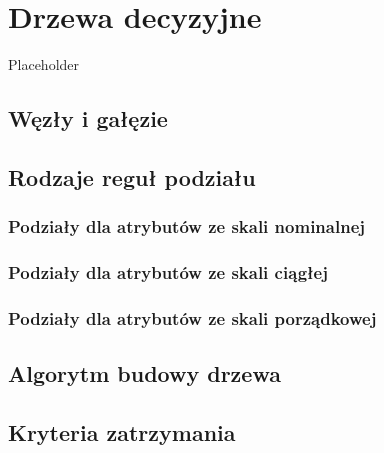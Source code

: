 \documentclass[]{book}
\theoremstyle{plain}
\theoremstyle{definition}
\begin{document}
\hypertarget{drzewa-decyzyjne}{%
\chapter{Drzewa decyzyjne}\label{drzewa-decyzyjne}}

Placeholder

\hypertarget{wezy-i-gaezie}{%
\section{Węzły i gałęzie}\label{wezy-i-gaezie}}

\hypertarget{rodzaje-regu-podziau}{%
\section{Rodzaje reguł podziału}\label{rodzaje-regu-podziau}}

\hypertarget{podziay-dla-atrybutow-ze-skali-nominalnej}{%
\subsection{Podziały dla atrybutów ze skali nominalnej}\label{podziay-dla-atrybutow-ze-skali-nominalnej}}

\hypertarget{podziay-dla-atrybutow-ze-skali-ciagej}{%
\subsection{Podziały dla atrybutów ze skali ciągłej}\label{podziay-dla-atrybutow-ze-skali-ciagej}}

\hypertarget{podziay-dla-atrybutow-ze-skali-porzadkowej}{%
\subsection{Podziały dla atrybutów ze skali porządkowej}\label{podziay-dla-atrybutow-ze-skali-porzadkowej}}

\hypertarget{algorytm-budowy-drzewa}{%
\section{Algorytm budowy drzewa}\label{algorytm-budowy-drzewa}}

\hypertarget{kryteria-zatrzymania}{%
\section{Kryteria zatrzymania}\label{kryteria-zatrzymania}}
\end{document}
